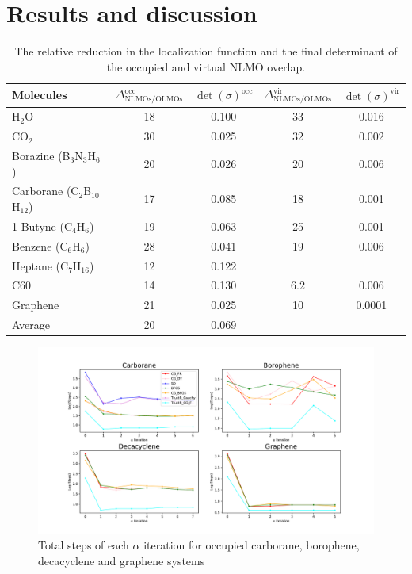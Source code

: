 \documentclass[aps,prl,reprint,amsmath,amssymb]{revtex4-1}
\begin{document}
\section{Results and discussion}
\begin{table}[htbp]
\caption{The relative reduction in the localization function and the final determinant of the occupied and virtual NLMO overlap.}
\label{tab:loc}
\centering
\begin{tabular}{l c c c c}
\hline\hline
Molecules & $\Delta_{\text{NLMOs/OLMOs}}^{\text{occ}}$ & $\det(\sigma)^{\text{occ}} $ & $\Delta_{\text{NLMOs/OLMOs}}^{\text{vir}}$ & $\det(\sigma)^{\text{vir}}$ \\
\hline
H$_2$O & 18 & 0.100 & 33 & 0.016 \\ 
CO$_2$ & 30 & 0.025 & 32 & 0.002\\
Borazine (B$_3$N$_3$H$_6$) & 20 & 0.026 & 20 & 0.006 \\
Carborane (C$_2$B$_{10}$H$_{12}$) & 17 & 0.085 & 18 & 0.001 \\ 
1-Butyne (C$_4$H$_6$) & 19 & 0.063 & 25 & 0.001 \\
Benzene (C$_6$H$_6$) & 28 & 0.041 & 19 & 0.006 \\ 
Heptane (C$_7$H$_{16}$) & 12 & 0.122 & & \\ 
C60 & 14 & 0.130 & 6.2 & 0.006 \\
Graphene & 21 & 0.025 & 10 & 0.0001 \\
\hline
Average & 20 & 0.069 & & \\
\hline
\hline
\end{tabular}
\label{table:nonlin}
\end{table}


\begin{figure}[htb]
\centering
\includegraphics[width=\textwidth]{occupied_iter.pdf}
\caption{Total steps of each $\alpha$ iteration for occupied carborane, borophene, decacyclene and graphene systems}
\label{fig:occ_iter}
\end{figure}
\end{document}
